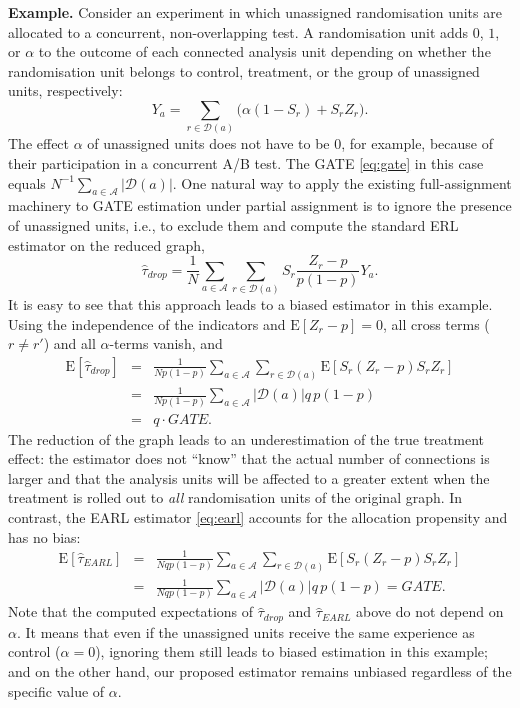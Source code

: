 \documentclass[sigconf,nonacm]{acmart}
\newcommand{\E}{\mathrm E}
\begin{document}
\medskip
\noindent \textbf{Example.}
Consider an experiment in which unassigned randomisation units are allocated to a concurrent, non-overlapping test. A randomisation unit adds $0$, $1$, or $\alpha$ to the outcome of each connected analysis unit depending on whether the randomisation unit belongs to control, treatment, or the group of unassigned units, respectively:
\begin{equation*}
    Y_a = \sum_{r\in\mathcal D(a)}\bigl(\alpha(1-S_r) + S_rZ_r\bigr).
\end{equation*}
The effect $\alpha$ of unassigned units does not have to be 0, for example, because of their participation in a concurrent A/B test. The GATE \eqref{eq:gate} in this case equals $N^{-1}\sum_{a\in\mathcal{A}}|\mathcal{D}(a)|$.
One natural way to apply the existing full-assignment machinery to GATE estimation under partial assignment is to ignore the presence of unassigned units, i.e., to exclude them and compute the standard ERL estimator \cite{harshaw2023erl} on the reduced graph,
\begin{equation}\label{eq:erl-drop}
    \hat \tau_{drop} = \frac 1 N \sum_{a\in\mathcal{A}}\sum_{r\in\mathcal{D}(a)}S_r\frac{Z_r-p}{p(1-p)}Y_a.
\end{equation}
It is easy to see that this approach leads to a biased estimator in this example. Using the independence of the indicators and $\E[Z_r-p]=0$, all cross terms ($r\neq r'$) and all $\alpha$-terms vanish, and
\begin{eqnarray*}
    \E[\hat\tau_{drop}] &=& \frac {1}{Np(1-p)}\sum_{a\in\mathcal{A}} \sum_{r\in\mathcal{D}(a)}\E\left[S_r(Z_r-p)S_rZ_r  \right]\\
    &=& \frac 1 {Np(1-p)}\sum_{a\in\mathcal{A}}\left|\mathcal{D}(a)\right|q\,p(1-p)\\
    &=&q \cdot GATE.
\end{eqnarray*}
The reduction of the graph leads to an underestimation of the true treatment effect: the estimator does not ``know'' that the actual number of connections is larger and that the analysis units will be affected to a greater extent when the treatment is rolled out to \emph{all} randomisation units of the original graph. In contrast, the EARL estimator \eqref{eq:earl} accounts for the allocation propensity and has no bias:
\begin{eqnarray*}
    \E[\hat\tau_{EARL}] &=& \frac {1}{Nqp(1-p)}\sum_{a\in\mathcal{A}} \sum_{r\in\mathcal{D}(a)}\E\left[S_r(Z_r-p)S_rZ_r  \right]\\
    &=& \frac 1 {Nqp(1-p)}\sum_{a\in\mathcal{A}}\left|\mathcal{D}(a)\right|q\,p(1-p)
    = GATE.
\end{eqnarray*}
Note that the computed expectations of $\hat \tau_{drop}$ and $\hat\tau_{EARL}$ above do not depend on $\alpha$. It means that even if the unassigned units receive the same experience as control ($\alpha=0$), ignoring them still leads to biased estimation in this example; and on the other hand, our proposed estimator remains unbiased regardless of the specific value of $\alpha$.
\end{document}

